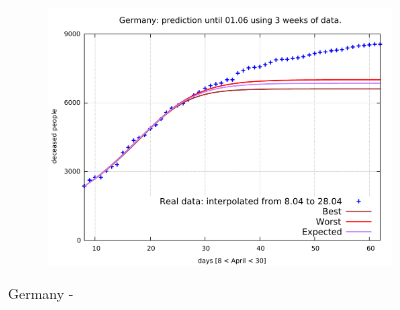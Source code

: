 \documentclass[8pt]{article}
\begin{document}
\begin{figure}[h!]
\begin{subfigure}[b]{0.45\linewidth}
  \includegraphics[width=\linewidth]{../err10p_simulations/de/8-28/8-28.pdf}
  \end{subfigure}
	\caption{Germany -}
\end{figure}
\end{document}
